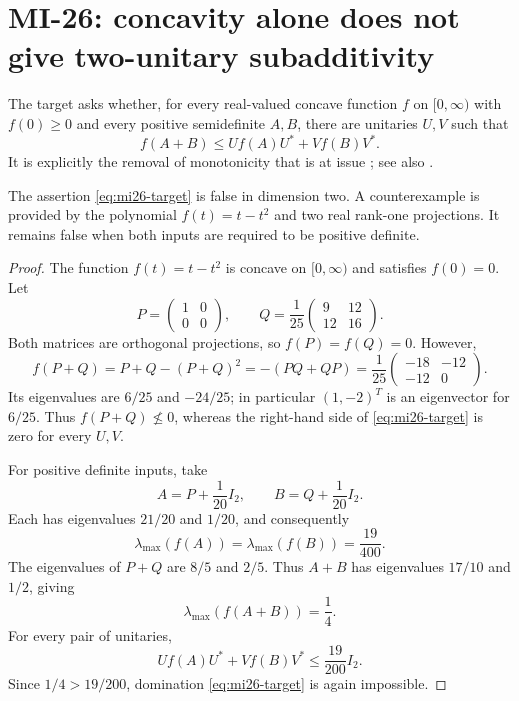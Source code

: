 \section{MI-26: concavity alone does not give two-unitary subadditivity}
\label{sec:mi26}

The target asks whether, for every real-valued concave function $f$ on $[0,\infty)$ with $f(0)\geq0$ and every positive semidefinite $A,B$, there are unitaries $U,V$ such that
\begin{equation}\label{eq:mi26-target}
 f(A+B)\leq Uf(A)U^*+Vf(B)V^*.
\end{equation}
It is explicitly the removal of monotonicity that is at issue \cite[Problem 5]{AK2012}; see also \cite[Remark 3.13]{BL2011}.

\begin{theorem}\label{thm:mi26}
The assertion \eqref{eq:mi26-target} is false in dimension two. A counterexample is provided by the polynomial $f(t)=t-t^2$ and two real rank-one projections. It remains false when both inputs are required to be positive definite.
\end{theorem}

\begin{proof}
The function $f(t)=t-t^2$ is concave on $[0,\infty)$ and satisfies $f(0)=0$. Let
\[
 P=\begin{pmatrix}1&0\\0&0\end{pmatrix},\qquad
 Q=\frac1{25}\begin{pmatrix}9&12\\12&16\end{pmatrix}.
\]
Both matrices are orthogonal projections, so $f(P)=f(Q)=0$. However,
\[
 f(P+Q)=P+Q-(P+Q)^2=-(PQ+QP)
 =\frac1{25}\begin{pmatrix}-18&-12\\-12&0\end{pmatrix}.
\]
Its eigenvalues are $6/25$ and $-24/25$; in particular $(1,-2)^T$ is an eigenvector for $6/25$. Thus $f(P+Q)\not\leq0$, whereas the right-hand side of \eqref{eq:mi26-target} is zero for every $U,V$.

For positive definite inputs, take
\[
 A=P+\frac1{20}I_2,\qquad B=Q+\frac1{20}I_2.
\]
Each has eigenvalues $21/20$ and $1/20$, and consequently
\[
 \lambda_{\max}(f(A))=\lambda_{\max}(f(B))=\frac{19}{400}.
\]
The eigenvalues of $P+Q$ are $8/5$ and $2/5$. Thus $A+B$ has eigenvalues $17/10$ and $1/2$, giving
\[
 \lambda_{\max}(f(A+B))=\frac14.
\]
For every pair of unitaries,
\[
 Uf(A)U^*+Vf(B)V^*\leq\frac{19}{200}I_2.
\]
Since $1/4>19/200$, domination \eqref{eq:mi26-target} is again impossible.
\end{proof}

